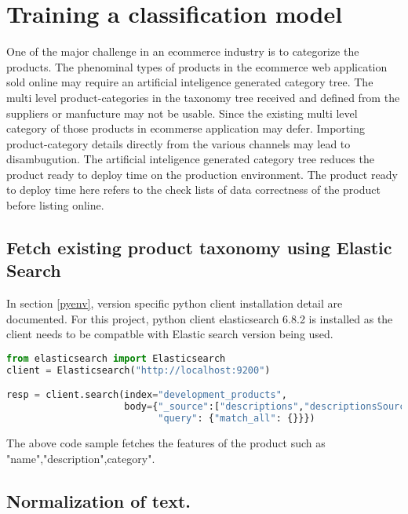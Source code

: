 \chapter{Training a classification model}

One of the major challenge in an ecommerce industry is to categorize the products. The phenominal types of products in the ecommerce web application sold online may require an artificial inteligence generated category tree. The multi level product-categories in the taxonomy tree received and defined from the suppliers or manfucture may not be usable. Since the existing multi level category of those products in ecommerse application may defer. Importing product-category details directly from the various channels may lead to disambugution. The artificial inteligence generated category tree reduces the product ready to deploy time on the production environment. The product ready to deploy time here refers to the check lists of data correctness of the product before listing online.

\section {Fetch existing product taxonomy using Elastic Search}

In section \ref {pyenv}, version specific python client installation detail are documented. For this project, python client elasticsearch 6.8.2 is installed as the client needs to be compatble with Elastic search version being used.


\begin{lstlisting}[language=Python]
from elasticsearch import Elasticsearch
client = Elasticsearch("http://localhost:9200")

resp = client.search(index="development_products",
                     body={"_source":["descriptions","descriptionsSource","nameSource","shortDescriptionSource","categoriesSource"],
                           "query": {"match_all": {}}})
\end{lstlisting}

The above code sample fetches the features of the product such as "name","description",category".

\section {Normalization of text.}